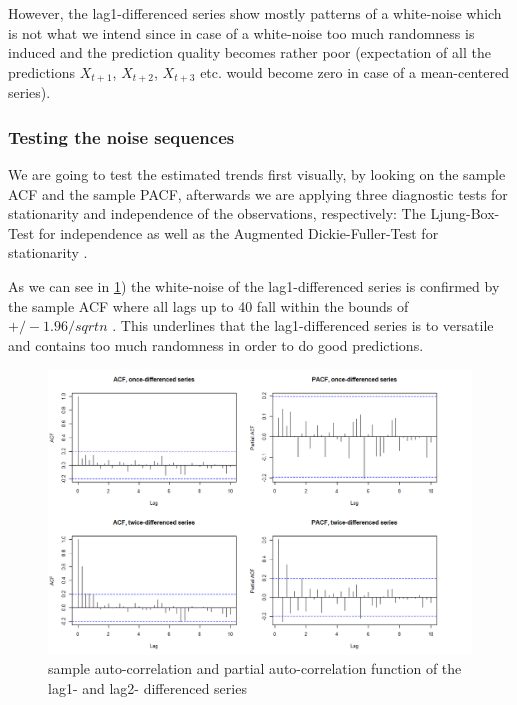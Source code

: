 \documentclass[11pt,a4paper]{article}
\begin{document}
However, the lag1-differenced series show mostly patterns of a white-noise which is not what we intend since in case of a white-noise too much randomness is induced and the prediction quality becomes rather poor (expectation of all the predictions $X_{t+1}$, $X_{t+2}$, $X_{t+3}$ etc. would become zero in case of a mean-centered series).


\subsubsection{Testing the noise sequences}

We are going to test the estimated trends first visually, by looking on the sample ACF and the sample PACF, afterwards we are applying three diagnostic tests for stationarity and independence of the observations, respectively:
The Ljung-Box-Test \citep{LjungBox78} for independence as well as the Augmented Dickie-Fuller-Test for stationarity \citep{adf}.

As we can see in \cref{fig:diff12_acf_pacf}) the white-noise of the lag1-differenced series is confirmed by the sample ACF where all lags up to 40 fall within the bounds of $+/-1.96/sqrt{n}$ \cite[p.~39]{bd02}.
This underlines that the lag1-differenced series is to versatile and contains too much randomness in order to do good predictions.

\begin{figure} [ht]
    \centering
    \includegraphics[width=1\textwidth]{diff12_acf_pacf}
    \caption{sample auto-correlation and partial auto-correlation function of the lag1- and lag2- differenced series}
    \label{fig:diff12_acf_pacf}
\end{figure}
\end{document}
